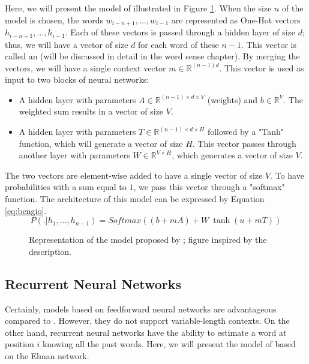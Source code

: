 \documentclass{KBook}
\begin{document}
Here, we will present the model of \citet{2003-bengio-al} illustrated in Figure \ref{fig:bengio-l}.
When the size $n$ of the model is chosen, the words $w_{i-n+1}, \ldots, w_{i-1}$ are represented as One-Hot vectors $h_{i-n+1}, \ldots, h_{i-1}$. 
Each of these vectors is passed through a hidden layer of size $d$; thus, we will have a vector of size $d$ for each word of these $n-1$. 
This vector is called an  (will be discussed in detail in the word sense chapter). 
By merging the vectors, we will have a single context vector $m \in \mathbb{R}^{(n-1) d}$.
This vector is used as input to two blocks of neural networks:
\begin{itemize}
	\item A hidden layer with parameters $A \in \mathbb{R}^{(n-1) \times d \times V}$ (weights) and $b \in \mathbb{R}^{V}$. 
	The weighted sum results in a vector of size $V$. 
	\item A hidden layer with parameters $T \in \mathbb{R}^{(n-1) \times d \times H}$ followed by a "Tanh" function, which will generate a vector of size $H$. 
	This vector passes through another layer with parameters $W \in \mathbb{R}^{V \times H}$, which generates a vector of size $V$. 
\end{itemize}
The two vectors are element-wise added to have a single vector of size $V$. 
To have probabilities with a sum equal to $1$, we pass this vector through a "softmax" function. 
The architecture of this model can be expressed by Equation \ref{eq:bengio}.
\begin{equation}
	P(.|h_1,\ldots, h_{n-1}) = 
	Softmax \left(
	(b + m A) 
	+ 
	W\ \tanh(u + m T)
	\right)
	\label{eq:bengio}
\end{equation}

\begin{figure}[ht]
	\centering
	\caption[Neural network-based language model.]{Representation of the model proposed by \citet{2003-bengio-al}; figure inspired by the description.}
	\label{fig:bengio-l}
\end{figure}


\subsection{Recurrent Neural Networks}

Certainly, models based on feedforward neural networks are advantageous compared to . 
However, they do not support variable-length contexts. 
On the other hand, recurrent neural networks have the ability to estimate a word at position $i$ knowing all the past words. 
Here, we will present the model of \citet{2010-mokolov-al} based on the Elman network.
\end{document}
